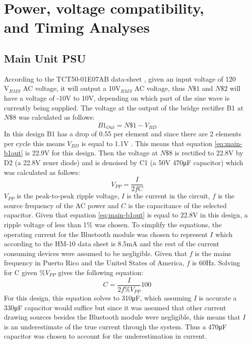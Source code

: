 \section{Power, voltage compatibility,\\ and Timing Analyses}
\subsection{Main Unit PSU}
According to the TCT50-01E07AB data-sheet \cite{TCT5001E07AB}, given an input voltage of 120$\si{\V}_{RMS}$ AC voltage, it will output a 10$\si{\V}_{RMS}$ AC voltage, thus $N\$1$ and $N\$2$ will have a voltage of -10\si{\V} to 10\si{\V}, depending on which part of the sine wave is currently being supplied. The voltage at the output of the bridge rectifier B1 at $N\$8$ was calculated as follows:
\begin{equation}
  B1_{Out} = N\$1 - V_{BD}
  \label{eq:main-b1out}
\end{equation}
In this design B1 has a drop of 0.55 per element and since there are 2 elements per cycle this means $V_{BD}$ is equal to 1.1\si{V} \cite{KMB23S}. This means that equation \ref{eq:main-b1out} is 22.9\si{\V} for this design. Then the voltage at $N\$8$ is rectified to 22.8\si{V} by D2 (a 22.8\si{\V} zener diode) and is denoised by C1 (a 50\si{\V} 470\si{\micro\farad} capacitor) which was calculated as follows:
\begin{equation}
  V_{PP} = \frac{I}{2fC}
  \label{eq:main-filter-cap}
\end{equation}
$V_{PP}$ is the peak-to-peak ripple voltage, $I$ is the current in the circuit, $f$ is the source frequency of the AC power and $C$ is the capacitance of the selected capacitor. Given that equation \ref{eq:main-b1out} is equal to 22.8\si{\V} in this design, a ripple voltage of less than 1\% was chosen. To simplify the equations, the operating current for the Bluetooth module was chosen to represent $I$ which according to the HM-10 data sheet is 8.5\si{\mA} and the rest of the current consuming devices were assumed to be negligible. Given that $f$ is the mains frequency in Puerto Rico and the United States of America, $f$ is 60\si{\Hz}. Solving for C given $\%V_{PP}$ gives the following equation:
\begin{equation}
  C = \frac{I}{2f\%V_{PP}}100
  \label{eq:cap-given-percent-vpp}
\end{equation}
For this design, this equation solves to 310\si{\micro\farad}, which assuming $I$ is accurate a 330\si{\micro\farad} capacitor would suffice but since it was assumed that other current drawing sources besides the Bluetooth module were negligible, this means that $I$ is an underestimate of the true current through the system. Thus a 470\si{\micro\farad} capacitor was chosen to account for the underestimation in current.\\\\
